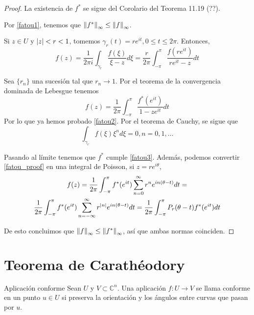\begin{proof}
La existencia de $f^*$ se sigue del Corolario del Teorema 11.19 (??). %

Por \ref{fatou1}, tenemos que $\left\lVert f^*\right\rVert_{\infty} \leq \left\lVert f\right\rVert_{\infty}$.

Si $z \in U$ y $\left\lvert z\right\rvert < r < 1$, tomemos $\gamma_r(t) = r e^{it}, 0 \leq t \leq 2\pi$. Entonces,
\begin{equation*}
f(z) = \dfrac{1}{2 \pi i} \int_{\gamma_r} \dfrac{f(\xi)}{\xi - z} d\xi = 
 \dfrac{r}{2 \pi} \int_{-\pi}^{\pi} \dfrac{f(re^{it})}{re^{it} - z} dt
\end{equation*}

Sea $\{r_n\}$ una sucesión tal que $r_n \rightarrow 1$. Por el teorema de la convergencia dominada de Lebesgue tenemos
\begin{equation}
\label{fatou_proof}
f(z) = \dfrac{1}{2 \pi} \int_{-\pi}^{\pi} \dfrac{f^* (e^{it})}{1 - ze^{it}} dt
\end{equation}
Por lo que ya hemos probado \ref{fatou2}. Por el teorema de Cauchy, se sigue que
\begin{equation*}
\int_{\gamma_r} f(\xi)\xi^n d\xi = 0, n = 0, 1, \dots
\end{equation*}

Pasando al límite tenemos que $f^*$ cumple \ref{fatou3}. Además, podemos convertir \ref{fatou_proof} en una integral de Poisson, si $z = re^{i \theta}$,
\begin{multline*}
f(z) = \dfrac{1}{2 \pi} \int_{- \pi}^{\pi} f^*(e^{it}) \sum_{n=0}^{\infty} r^n e^{in(\theta - t)} dt = \\  \dfrac{1}{2 \pi} \int_{- \pi}^{\pi} f^*(e^{it}) \sum_{n=-\infty}^{\infty} r^{\left\lvert n\right\rvert} e^{in(\theta - t)} dt =  \dfrac{1}{2 \pi} \int_{- \pi}^{\pi} P_r(\theta - t) f^*(e^{it}) dt
\end{multline*}

De esto concluimos que $\left\lVert f\right\rVert_{\infty} \leq \left\lVert f^*\right\rVert_{\infty}$, así que ambas normas coinciden.
\end{proof}

\section{Teorema de Carathéodory}

\begin{definition}{Aplicación conforme}
Sean $U$ y $V \subset \mathbb{C}^n$. Una aplicación $f: U \rightarrow V$ se llama conforme en un punto $u \in U$ si preserva la orientación y los ángulos entre curvas que pasan por $u$.
\end{definition}

